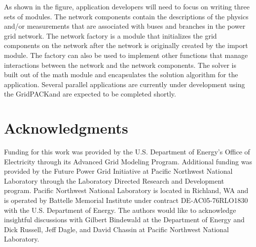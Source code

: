 \documentclass[preprint]{acm_proc_article-sp}
\begin{document}
As shown in the figure, application developers will need to focus on
writing three sets of modules. The network components
contain the descriptions of the physics and/or
measurements that are associated with buses and branches in the power grid
network. The network factory is a module that initializes the grid components
on the network after the network is originally created by the import module. The
factory can also be used to implement other functions that manage interactions
between the network and the network components.  The solver is built out of
the math module and encapsulates the solution algorithm for the application.
Several parallel applications are currently under development using the
GridPACK\texttrademark and are expected to be completed shortly.

\section{Acknowledgments}
Funding for this work was provided by the U.S. Department of Energy's Office of
Electricity through its Advanced Grid Modeling Program.
Additional funding was provided by the Future Power Grid Initiative at Pacific
Northwest National Laboratory through the Laboratory Directed Research and
Development program.
Pacific Northwest National Laboratory is located in Richland, WA and is operated
by Battelle Memorial Institute under contract DE-AC05-76RLO1830 with the U.S.
Department of Energy. The authors would like to acknowledge insightful
discussions with Gilbert Bindewald at the Department of Energy and Dick Russell,
Jeff Dagle, and David Chassin at Pacific Northwest National Laboratory.



\end{document}
